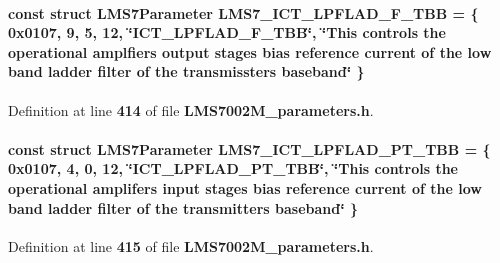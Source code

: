 \paragraph[{L\+M\+S7\+\_\+\+I\+C\+T\+\_\+\+L\+P\+F\+L\+A\+D\+\_\+\+F\+\_\+\+T\+BB}]{\setlength{\rightskip}{0pt plus 5cm}const struct {\bf L\+M\+S7\+Parameter} L\+M\+S7\+\_\+\+I\+C\+T\+\_\+\+L\+P\+F\+L\+A\+D\+\_\+\+F\+\_\+\+T\+BB = \{ 0x0107, 9, 5, 12, \char`\"{}\+I\+C\+T\+\_\+\+L\+P\+F\+L\+A\+D\+\_\+\+F\+\_\+\+T\+B\+B\char`\"{}, \char`\"{}\+This controls the operational amplfiers\textquotesingle{} output stages bias reference current of the low band ladder filter of the transmisster\textquotesingle{}s baseband\char`\"{} \}\hspace{0.3cm}{\ttfamily [static]}}\label{LMS7002M__parameters_8h_ad714cb98bada639ccf603275ab9b4cc6}


Definition at line {\bf 414} of file {\bf L\+M\+S7002\+M\+\_\+parameters.\+h}.

\paragraph[{L\+M\+S7\+\_\+\+I\+C\+T\+\_\+\+L\+P\+F\+L\+A\+D\+\_\+\+P\+T\+\_\+\+T\+BB}]{\setlength{\rightskip}{0pt plus 5cm}const struct {\bf L\+M\+S7\+Parameter} L\+M\+S7\+\_\+\+I\+C\+T\+\_\+\+L\+P\+F\+L\+A\+D\+\_\+\+P\+T\+\_\+\+T\+BB = \{ 0x0107, 4, 0, 12, \char`\"{}\+I\+C\+T\+\_\+\+L\+P\+F\+L\+A\+D\+\_\+\+P\+T\+\_\+\+T\+B\+B\char`\"{}, \char`\"{}\+This controls the operational amplifers\textquotesingle{} input stages bias reference current of the low band ladder filter of the transmitter\textquotesingle{}s baseband\char`\"{} \}\hspace{0.3cm}{\ttfamily [static]}}\label{LMS7002M__parameters_8h_a2ca1237dab04f2ea2f881d0e36753ae2}


Definition at line {\bf 415} of file {\bf L\+M\+S7002\+M\+\_\+parameters.\+h}.

